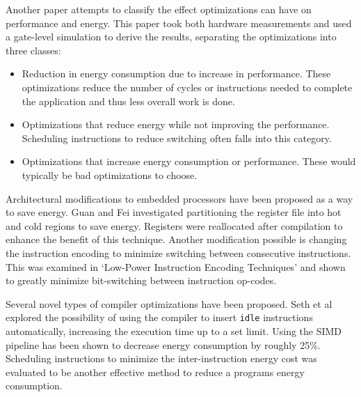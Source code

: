 \documentclass[twocolumn]{article}
\begin{document}
Another paper attempts to classify the effect optimizations can have on performance and energy\cite{WhatCanAPoorCompilerDo}. This paper took both hardware measurements and used a gate-level simulation to derive the results,  separating the optimizations into three classes:
\begin{itemize}
	\setlength{\itemsep}{0em}
	\vspace{-1mm}
	\item Reduction in energy consumption due to increase in performance. These optimizations reduce the number of cycles or instructions needed to complete the application and thus less overall work is done.
	\item Optimizations that reduce energy while not improving the performance. Scheduling instructions to reduce switching often falls into this category.
	\item Optimizations that increase energy consumption or performance. These would typically be bad optimizations to choose.
\end{itemize}


Architectural modifications to embedded processors have been proposed as a way to save energy. Guan and Fei investigated partitioning the register file\cite{RegisterFilePartitioning} into hot and cold regions to save energy. Registers were reallocated after compilation to enhance the benefit of this technique. Another modification possible is changing the instruction encoding to minimize switching between consecutive instructions. This was examined in `Low-Power Instruction Encoding Techniques'\cite{LowPowerInstructionEncodings} and shown to greatly minimize bit-switching between instruction op-codes.

Several novel types of compiler optimizations have been proposed. Seth et al\cite{Seth2001} explored the possibility of using the compiler to insert \texttt{idle} instructions automatically, increasing the execution time up to a set limit. Using the SIMD pipeline has been shown to decrease energy consumption\cite{Ibrahim2009} by roughly 25\%. Scheduling instructions to minimize the inter-instruction energy cost was evaluated to be another effective method to reduce a programs energy consumption\cite{Parikh}.
\end{document}
